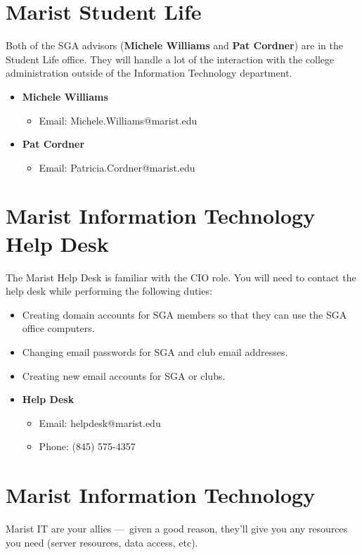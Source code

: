 \documentclass[11pt]{report}
\begin{document}
	\section{Marist Student Life}
		Both of the SGA advisors (\textbf{Michele Williams} and \textbf{Pat Cordner}) are in the Student Life office. They will handle a lot of the interaction with the college administration outside of the Information Technology department.

		\begin{itemize}
			\item
				\textbf{Michele Williams}
				\begin{itemize}
					\item Email: Michele.Williams@marist.edu
				\end{itemize}
			\item
				\textbf{Pat Cordner}
				\begin{itemize}
					\item Email: Patricia.Cordner@marist.edu
				\end{itemize}
		\end{itemize}


	\section{Marist Information Technology Help Desk}
		The Marist Help Desk is familiar with the CIO role. You will need to contact the help desk while performing the following duties:

		\begin{itemize}
			\item Creating domain accounts for SGA members so that they can use the SGA office computers.
			\item Changing email passwords for SGA and club email addresses.
			\item Creating new email accounts for SGA or clubs.
		\end{itemize}

		\begin{itemize}
			\item{
				\textbf{Help Desk}
				\begin{itemize}
					\item Email: helpdesk@marist.edu
					\item Phone: (845) 575-4357
				\end{itemize}
			}
		\end{itemize}

	\section{Marist Information Technology}
		Marist IT are your allies — given a good reason, they'll give you any resources you need (server resources, data access, etc).
\end{document}
